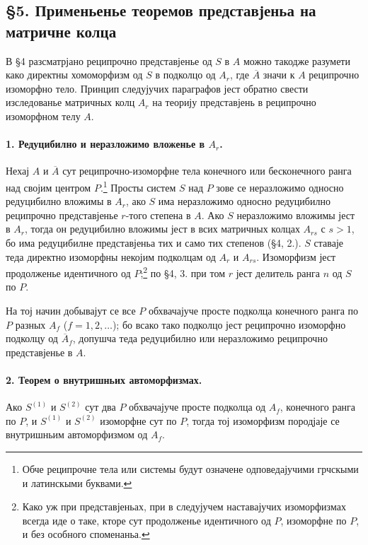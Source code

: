 ﻿\documentclass[11pt]{article}
\begin{document}
\subsection*{§5. Применьенье теоремов представјеньа на матричне колца}

В §4 разсматрјано реципрочно представјенье од \(S\) в \(A\) можно такодже разумети како директны хомоморфизм од \(S\) в подколцо од \(A_r\), где \(\overline A\) значи к \(A\) реципрочно изоморфно тело. Принцип следујучих параграфов јест обратно свести изследованье матричных колц \(A_r\) на теорију представјень в реципрочно изоморфном телу \(A\).

\paragraph{1. Редуцибилно и неразложимо вложенье в \(A_r\).}
Нехај \(A\) и \(\overline A\) сут реципрочно-изоморфне тела конечного или бесконечного ранга над својим центром \(P\).\footnote{Обче реципрочне тела или системы будут означене одповедајучими грчскыми и латинскыми буквами.} Просты систем \(S\) над \(P\) зове се неразложимо односно редуцибилно вложимы в \(A_r\), ако \(S\) има неразложимо односно редуцибилно реципрочно представјенье \(r\)-того степена в \(A\). Ако \(S\) неразложимо вложимы јест в \(A_r\), тогда он редуцибилно вложимы јест в всих матричных колцах \(A_{rs}\) с \(s>1\), бо има редуцибилне представјеньа тих и само тих степенов (§4, 2.). \(S\) ставаје теда директно изоморфны некојим подколцам од \(A_r\) и \(A_{rs}\). Изоморфизм јест продолженье идентичного од \(P\);\footnote{Како уж при представјеньах, при в следујучем наставајучих изоморфизмах всегда иде о таке, кторе сут продолженье идентичного од \(P\), изоморфне по \(P\), и без особного споменаньа.} по §4, 3. при том \(r\) јест делитель ранга \(n\) од \(S\) по \(P\).

На тој начин добывајут се все \(P\) обхвачајуче просте подколца конечного ранга по \(P\) разных \(A_f\) (\(f=1,2,\ldots\)); бо всако тако подколцо јест реципрочно изоморфно подколцу од \(\overline A_f\), допушча теда редуцибилно или неразложимо реципрочно представјенье в \(A\).

\paragraph{2. Теорем о внутришньих автоморфизмах.}
Ако \(S^{(1)}\) и \(S^{(2)}\) сут два \(P\) обхвачајуче просте подколца од \(A_f\), конечного ранга по \(P\), и \(S^{(1)}\) и \(S^{(2)}\) изоморфне сут по \(P\), тогда тој изоморфизм породјаје се внутришньим автоморфизмом од \(A_f\).
\end{document}
